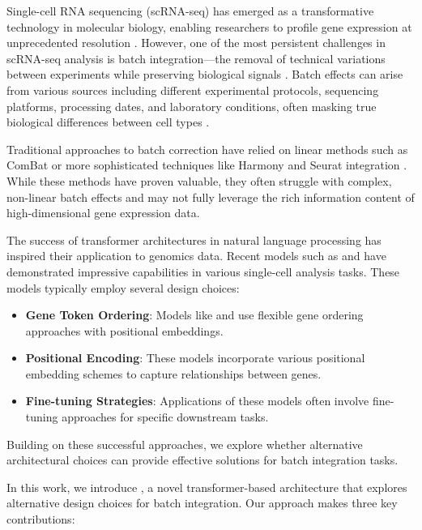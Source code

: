 Single-cell RNA sequencing (scRNA-seq) has emerged as a transformative technology in molecular biology, enabling researchers to profile gene expression at unprecedented resolution \citep{tanay2017scaling}. However, one of the most persistent challenges in scRNA-seq analysis is batch integration—the removal of technical variations between experiments while preserving biological signals \citep{luecken2021benchmarking}. Batch effects can arise from various sources including different experimental protocols, sequencing platforms, processing dates, and laboratory conditions, often masking true biological differences between cell types \citep{tran2020benchmark}.

Traditional approaches to batch correction have relied on linear methods such as ComBat \citep{johnson2007adjusting} or more sophisticated techniques like Harmony \citep{korsunsky2019fast} and Seurat integration \citep{stuart2019comprehensive}. While these methods have proven valuable, they often struggle with complex, non-linear batch effects and may not fully leverage the rich information content of high-dimensional gene expression data.

The success of transformer architectures in natural language processing has inspired their application to genomics data. Recent models such as \scgpt{} \citep{cui2024scgpt} and \scbert{} \citep{yang2022scbert} have demonstrated impressive capabilities in various single-cell analysis tasks. These models typically employ several design choices:

\begin{itemize}
\item \textbf{Gene Token Ordering}: Models like \scgpt{} and \scbert{} use flexible gene ordering approaches with positional embeddings.
\item \textbf{Positional Encoding}: These models incorporate various positional embedding schemes to capture relationships between genes.
\item \textbf{Fine-tuning Strategies}: Applications of these models often involve fine-tuning approaches for specific downstream tasks.
\end{itemize}

Building on these successful approaches, we explore whether alternative architectural choices can provide effective solutions for batch integration tasks.

In this work, we introduce \bioformer{}, a novel transformer-based architecture that explores alternative design choices for batch integration. Our approach makes three key contributions:

